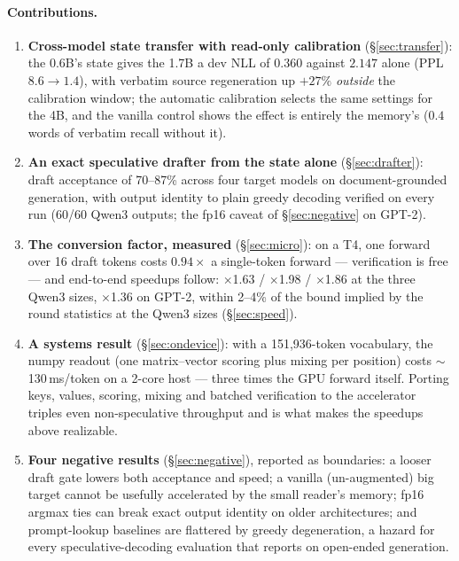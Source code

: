 \documentclass[11pt]{article}
\begin{document}
\paragraph{Contributions.}
\begin{enumerate}[leftmargin=1.5em,itemsep=2pt]
\item \textbf{Cross-model state transfer with read-only calibration} (\S\ref{sec:transfer}): the 0.6B's state gives the 1.7B a dev NLL of $0.360$ against $2.147$ alone (PPL $8.6 \to 1.4$), with verbatim source regeneration up $+27\%$ \emph{outside} the calibration window; the automatic calibration selects the same settings for the 4B, and the vanilla control shows the effect is entirely the memory's ($0.4$ words of verbatim recall without it).
\item \textbf{An exact speculative drafter from the state alone} (\S\ref{sec:drafter}): draft acceptance of 70--87\% across four target models on document-grounded generation, with output identity to plain greedy decoding verified on every run (60/60 Qwen3 outputs; the fp16 caveat of \S\ref{sec:negative} on GPT-2).
\item \textbf{The conversion factor, measured} (\S\ref{sec:micro}): on a T4, one forward over 16 draft tokens costs $0.94\times$ a single-token forward --- verification is free --- and end-to-end speedups follow: $\times$1.63 / $\times$1.98 / $\times$1.86 at the three Qwen3 sizes, $\times$1.36 on GPT-2, within 2--4\% of the bound implied by the round statistics at the Qwen3 sizes (\S\ref{sec:speed}).
\item \textbf{A systems result} (\S\ref{sec:ondevice}): with a 151{,}936-token vocabulary, the numpy readout (one matrix--vector scoring plus mixing per position) costs $\sim$130\,ms/token on a 2-core host --- three times the GPU forward itself. Porting keys, values, scoring, mixing and batched verification to the accelerator triples even non-speculative throughput and is what makes the speedups above realizable.
\item \textbf{Four negative results} (\S\ref{sec:negative}), reported as boundaries: a looser draft gate lowers both acceptance and speed; a vanilla (un-augmented) big target cannot be usefully accelerated by the small reader's memory; fp16 argmax ties can break exact output identity on older architectures; and prompt-lookup baselines are flattered by greedy degeneration, a hazard for every speculative-decoding evaluation that reports on open-ended generation.
\end{enumerate}
\end{document}
